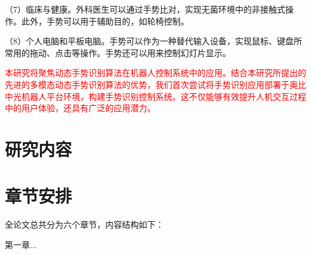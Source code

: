 （7）临床与健康。外科医生可以通过手势比对，实现无菌环境中的非接触式操作\cite{strickland2013using}。此外，手势可以用于辅助目的，如轮椅控制\cite{zeng2012natural}。

（8）个人电脑和平板电脑。手势可以作为一种替代输入设备，实现鼠标、键盘所常用的拖动、点击等操作。手势还可以用来控制幻灯片显示\cite{starner1998real}。

\textcolor{red}{本研究将聚焦动态手势识别算法在机器人控制系统中的应用。结合本研究所提出的先进的多模态动态手势识别算法的优势，我们首次尝试将手势识别应用部署于奥比中光机器人平台环境，构建手势识别控制系统。这不仅能够有效提升人机交互过程中的用户体验，还具有广泛的应用潜力。}



\section{研究内容}



\section{章节安排}

全论文总共分为六个章节，内容结构如下：

第一章...

